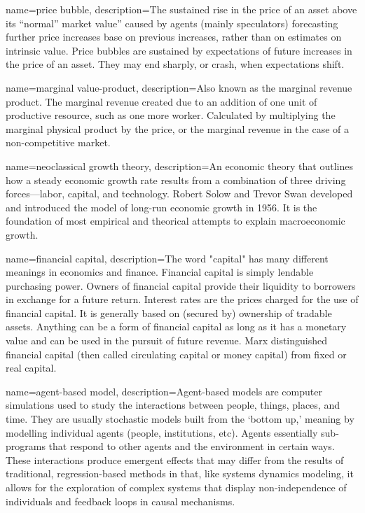 {
name=price bubble,
description={The sustained rise in the price of an asset above its ``normal'' market value'' caused by agents (mainly speculators) forecasting further price increases base on previous increases, rather than on estimates on intrinsic value.  Price bubbles are sustained by expectations of future increases in the price of an asset. They may end sharply, or crash, when expectations shift.}
}

{
name=marginal value-product,
description={Also known as the marginal revenue product. The marginal revenue created due to an addition of one unit of productive resource, such as one more worker. Calculated by multiplying the marginal physical product by the price, or the marginal revenue in the case of a non-competitive market.}
}

{
name=neoclassical growth theory,
description={An economic theory that outlines how a steady economic growth rate results from a combination of three driving forces—labor, capital, and technology. Robert Solow and Trevor Swan developed and introduced the model of long-run economic growth in 1956. It is the  foundation of most empirical and theorical attempts to explain macroeconomic growth.}
}

{
name=financial capital,
description={The word "capital" has many different meanings in economics and finance. Financial capital is simply lendable purchasing power. Owners of financial capital provide their liquidity to borrowers in exchange for a future return. Interest rates are the prices charged for the use of financial capital. It is generally based on (secured by) ownership of tradable assets.  Anything can be a form of financial capital as long as it has a monetary value and can be  used in the pursuit of future revenue. Marx distinguished  financial capital (then called circulating capital or money capital) from fixed or real capital.}
}

{
name=agent-based model,
description={Agent-based models are computer simulations used to study the interactions between people, things, places, and time. They are usually stochastic models built from the `bottom up,' meaning by modelling individual agents (people, institutions, etc). Agents essentially sub-programs that respond to other agents and the environment in certain ways. These interactions produce emergent effects that may differ from the results of traditional, regression-based methods in that, like systems dynamics modeling, it allows for the exploration of complex systems that display non-independence of individuals and feedback loops in causal mechanisms.}
}

